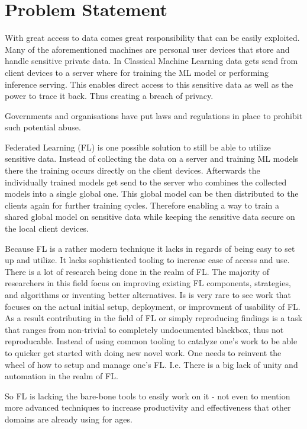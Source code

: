 
\section{Problem Statement}

With great access to data comes great responsibility that can be easily exploited.
Many of the aforementioned machines are personal user devices that store and handle sensitive private data.
In Classical Machine Learning data gets send from client devices to a server where for training the ML model or performing inference serving.
This enables direct access to this sensitive data as well as the power to trace it back.
Thus creating a breach of privacy.

Governments and organisations have put laws and regulations in place to prohibit such potential abuse.

Federated Learning (FL) is one possible solution to still be able to utilize sensitive data.
Instead of collecting the data on a server and training ML models there the training occurs directly on the client devices.
Afterwards the individually trained models get send to the server who combines the collected models into a single global one.
This global model can be then distributed to the clients again for further training cycles.
Therefore enabling a way to train a shared global model on sensitive data while keeping the sensitive data secure on the local client devices.

Because FL is a rather modern technique it lacks in regards of being easy to set up and utilize.
It lacks sophisticated tooling to increase ease of access and use.
There is a lot of research being done in the realm of FL.
The majority of researchers in this field focus on improving existing FL components, strategies, and algorithms or inventing better alternatives.
Is is very rare to see work that focuses on the actual initial setup, deployment, or improvment of usability of FL.
As a result contributing in the field of FL or simply reproducing findings is a task that ranges from non-trivial to completely undocumented blackbox, thus not reproducable.
Instead of using common tooling to catalyze one's work to be able to quicker get started with doing new novel work.
One needs to reinvent the wheel of how to setup and manage one's FL.
I.e. There is a big lack of unity and automation in the realm of FL.

So FL is lacking the bare-bone tools to easily work on it - not even to mention more advanced techniques to increase productivity and effectiveness that other domains are already using for ages.
